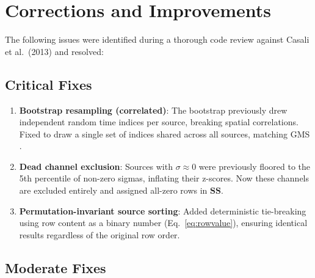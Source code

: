 \documentclass[11pt,a4paper]{article}
\begin{document}
\section{Corrections and Improvements}
\label{sec:fixes}

The following issues were identified during a thorough code review against Casali et al.\ (2013)
and resolved:

\subsection{Critical Fixes}

\begin{enumerate}[leftmargin=2em]
  \item \textbf{Bootstrap resampling (correlated)}: The bootstrap previously drew independent
        random time indices per source, breaking spatial correlations. Fixed to draw a single
        set of indices shared across all sources, matching GMS \cite{nichols2002}.

  \item \textbf{Dead channel exclusion}: Sources with $\sigma \approx 0$ were previously
        floored to the 5th percentile of non-zero sigmas, inflating their z-scores. Now these
        channels are excluded entirely and assigned all-zero rows in $\mathbf{SS}$.

  \item \textbf{Permutation-invariant source sorting}: Added deterministic tie-breaking using
        row content as a binary number (Eq.~\ref{eq:rowvalue}), ensuring identical results
        regardless of the original row order.
\end{enumerate}

\subsection{Moderate Fixes}
\end{document}
